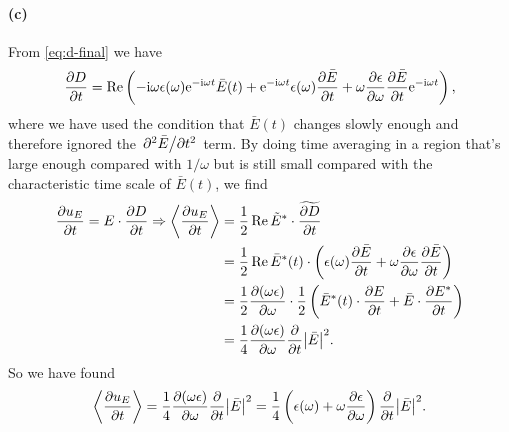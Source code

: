 \documentclass[hyperref, a4paper]{article}
\newcommand*{\ii}{\mathrm{i}}
\newcommand*{\ee}{\mathrm{e}}
\begin{document}
\paragraph{(c)} From \eqref{eq:d-final} we have 
\begin{equation}
    \pdv{D}{t} = \Re \left(
        - \ii \omega \epsilon(\omega) \ee^{- \ii \omega t} \bar{E}(t)
        + \ee^{- \ii \omega t} \epsilon(\omega) \pdv{\bar{E}}{t} 
        + \omega \pdv{\epsilon}{\omega} \pdv{\bar{E}}{t} \ee^{- \ii \omega t} 
    \right) ,
\end{equation}
where we have used the condition that $\bar{E}(t)$ changes slowly enough
and therefore ignored the $\pdv*[2]{\bar{E}}{t}$ term.
By doing time averaging in a region that's large enough compared with $1 / \omega$ 
but is still small compared with the characteristic time scale of $\bar{E}(t)$,
we find 
\begin{equation}
    \begin{aligned}
        \pdv{u_E}{t} = E \cdot \pdv{D}{t} \Rightarrow
        \expval{\pdv{u_E}{t}} &= \frac{1}{2} \Re \tilde{E}^* \cdot \widetilde{\pdv{D}{t}} \\
        &= \frac{1}{2} \Re \bar{E}^*(t) \cdot 
        \left(
            \epsilon(\omega) \pdv{\bar{E}}{t} 
            + \omega \pdv{\epsilon}{\omega} \pdv{\bar{E}}{t} 
        \right) \\
        &= \frac{1}{2} \pdv{(\omega \epsilon)}{\omega}
        \cdot \frac{1}{2} \left(
            \bar{E}^*(t) \cdot \pdv{E}{t} 
            + \bar{E} \cdot \pdv{E^*}{t}
        \right)  \\
        &= \frac{1}{4} \pdv{(\omega \epsilon)}{\omega} \pdv{t} \abs{\bar{E}}^2.
    \end{aligned}
\end{equation}
So we have found 
\begin{equation}
    \expval{\pdv{u_E}{t}} = \frac{1}{4} \pdv{(\omega \epsilon)}{\omega} \pdv{t} \abs{\bar{E}}^2
    = \frac{1}{4} \left(
        \epsilon(\omega) + \omega \pdv{\epsilon}{\omega}
    \right) \pdv{t} \abs{\bar{E}}^2.
\end{equation}
\end{document}
